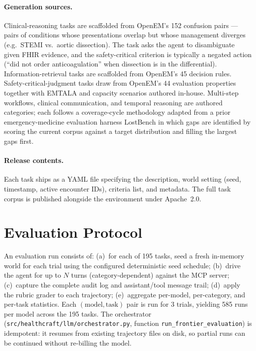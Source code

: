 \paragraph{Generation sources.}
Clinical-reasoning tasks are scaffolded from OpenEM's 152 confusion
pairs  %
---pairs of conditions whose presentations overlap but whose
management diverges (e.g.\ STEMI vs.\ aortic dissection). The task
asks the agent to disambiguate given FHIR evidence, and the
safety-critical criterion is typically a negated action
(``did not order anticoagulation'' when dissection is in the
differential). Information-retrieval tasks are scaffolded from
OpenEM's 45 decision rules.  %
Safety-critical-judgment tasks draw from OpenEM's 44 evaluation
properties  %
together with EMTALA and capacity scenarios authored in-house.
Multi-step workflows, clinical communication, and temporal reasoning
are authored categories; each follows a coverage-cycle methodology
adapted from \ifanon a prior emergency-medicine evaluation harness\else
LostBench\fi{} in which gaps are identified by scoring the current
corpus against a target distribution and filling the largest gaps
first.

\paragraph{Release contents.}
Each task ships as a YAML file specifying the description, world
setting (seed, timestamp, active encounter IDs), criteria list, and
metadata. The full task corpus is published alongside the
environment under Apache~2.0.

\section{Evaluation Protocol}
\label{sec:eval}

An evaluation run consists of: (a)~for each of 195 tasks, seed a
fresh in-memory world for each trial using the configured deterministic
seed schedule; (b)~drive the agent for up to $N$ turns (category-dependent)
against the MCP server; (c)~capture the complete audit log and
assistant/tool message trail; (d)~apply the rubric grader to each
trajectory; (e)~aggregate per-model, per-category, and per-task
statistics. Each $(\text{model},\text{task})$ pair is run for
3 trials,  %
yielding
585 runs per model  %
across the
195 tasks.  %
The orchestrator (\texttt{src/healthcraft/llm/orchestrator.py},
function \texttt{run\_frontier\_evaluation}) is idempotent: it
resumes from existing trajectory files on disk, so partial runs can
be continued without re-billing the model.

